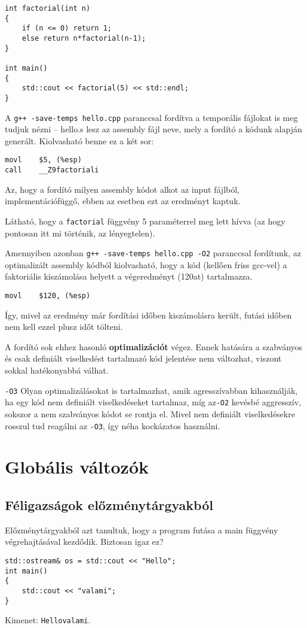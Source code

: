 \documentclass[a4paper,11.5pt,table]{article}
\begin{document}
	\begin{lstlisting}
int factorial(int n)
{
	if (n <= 0) return 1;
	else return n*factorial(n-1);
}

int main()
{
	std::cout << factorial(5) << std::endl;
}
	\end{lstlisting}
	
	A \texttt{g++ -save-temps hello.cpp} paranccsal fordítva a temporális fájlokat is meg tudjuk nézni -- hello.s lesz az assembly fájl neve, mely a fordító a kódunk alapján generált. Kiolvasható benne ez a két sor:
	\begin{lstlisting}
movl 	$5, (%esp)
call	__Z9factoriali
	\end{lstlisting}
	\begin{note}
		Az, hogy a fordító milyen assembly kódot alkot az input fájlból, implementációfüggő, ebben az esetben ezt az eredményt kaptuk.
	\end{note}
	Látható, hogy a \texttt{factorial} függvény 5 paraméterrel meg lett hívva (az hogy pontosan itt mi történik, az lényegtelen).
	
	\medskip
	Amennyiben azonban \texttt{g++ -save-temps hello.cpp -O2} paranccsal fordítunk, az optimalizált assembly kódból kiolvasható, hogy a kód (kellően friss gcc-vel) a faktoriális kiszámolása helyett a végeredményt (120at) tartalmazza. 
	\begin{lstlisting}
movl	$120, (%esp)
	\end{lstlisting}
	Így, mivel az eredmény már fordítási időben kiszámolásra került, futási időben nem kell ezzel plusz időt tölteni.
	
	A fordító sok ehhez hasonló \textbf{optimalizációt} végez. Ennek hatására a szabványos és csak definiált viselkedést tartalmazó kód jelentése nem változhat, viszont sokkal hatékonyabbá válhat.
	\begin{note}
		\texttt{-O3} Olyan optimalizálásokat is tartalmazhat, amik agresszívabban kihasználják, ha egy kód nem definiált viselkedéseket tartalmaz, míg az\texttt{-O2} kevésbé aggresszív, sokszor a nem szabványos kódot se rontja el. Mivel nem definiált viselkedésekre rosszul tud reagálni az \texttt{-O3}, így néha kockázatos használni.
	\end{note}
	\section{Globális változók}
	\subsection{Féligazságok előzménytárgyakból}
	Előzménytárgyakból azt tanultuk, hogy a program futása a main függvény végrehajtásával kezdődik. Biztosan igaz ez?
	\begin{lstlisting}
std::ostream& os = std::cout << "Hello";
int main()
{
	std::cout << "valami";
}
	\end{lstlisting}
	Kimenet: \texttt{Hellovalami}.
	\medskip
	
\end{document}
